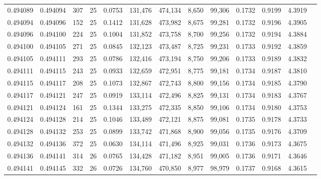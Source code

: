 \begin{tabular}{rrrrrrrrrrrrr}
0.494089 & 0.494094 & 307 &  25 &                                     0.0753 & 131,476 & 474,134 &   8,650 &  99,306 & 0.1732 & 0.9199 & 4.3919 \\
0.494094 & 0.494096 & 152 &  25 &                                     0.1412 & 131,628 & 473,982 &   8,675 &  99,281 & 0.1732 & 0.9196 & 4.3905 \\
0.494096 & 0.494100 & 224 &  25 &                                     0.1004 & 131,852 & 473,758 &   8,700 &  99,256 & 0.1732 & 0.9194 & 4.3884 \\
0.494100 & 0.494105 & 271 &  25 &                                     0.0845 & 132,123 & 473,487 &   8,725 &  99,231 & 0.1733 & 0.9192 & 4.3859 \\
0.494105 & 0.494111 & 293 &  25 &                                     0.0786 & 132,416 & 473,194 &   8,750 &  99,206 & 0.1733 & 0.9189 & 4.3832 \\
0.494111 & 0.494115 & 243 &  25 &                                     0.0933 & 132,659 & 472,951 &   8,775 &  99,181 & 0.1734 & 0.9187 & 4.3810 \\
0.494115 & 0.494117 & 208 &  25 &                                     0.1073 & 132,867 & 472,743 &   8,800 &  99,156 & 0.1734 & 0.9185 & 4.3790 \\
0.494117 & 0.494121 & 247 &  25 &                                     0.0919 & 133,114 & 472,496 &   8,825 &  99,131 & 0.1734 & 0.9183 & 4.3767 \\
0.494121 & 0.494124 & 161 &  25 &                                     0.1344 & 133,275 & 472,335 &   8,850 &  99,106 & 0.1734 & 0.9180 & 4.3753 \\
0.494124 & 0.494128 & 214 &  25 &                                     0.1046 & 133,489 & 472,121 &   8,875 &  99,081 & 0.1735 & 0.9178 & 4.3733 \\
0.494128 & 0.494132 & 253 &  25 &                                     0.0899 & 133,742 & 471,868 &   8,900 &  99,056 & 0.1735 & 0.9176 & 4.3709 \\
0.494132 & 0.494136 & 372 &  25 &                                     0.0630 & 134,114 & 471,496 &   8,925 &  99,031 & 0.1736 & 0.9173 & 4.3675 \\
0.494136 & 0.494141 & 314 &  26 &                                     0.0765 & 134,428 & 471,182 &   8,951 &  99,005 & 0.1736 & 0.9171 & 4.3646 \\
0.494141 & 0.494145 & 332 &  26 &                                     0.0726 & 134,760 & 470,850 &   8,977 &  98,979 & 0.1737 & 0.9168 & 4.3615 \\

\end{tabular}
